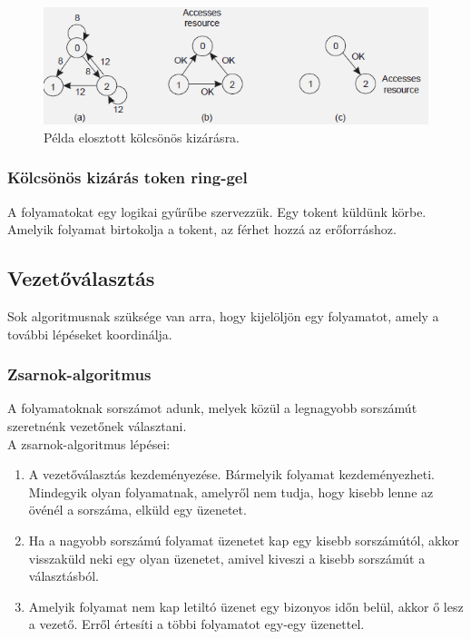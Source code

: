 \documentclass[12pt]{article}
\begin{document}
	\begin{figure}[H]
		\centering
		\includegraphics[width=0.6\linewidth]{img/kolcskizar_elosztott}
		\caption{Példa elosztott kölcsönös kizárásra.}
		\label{fig:kolcskizar_elosztott}
	\end{figure}
	
	\subsubsection{Kölcsönös kizárás token ring-gel}
	
	A folyamatokat egy logikai gyűrűbe szervezzük. Egy tokent küldünk körbe. Amelyik folyamat birtokolja a tokent, az
	férhet hozzá az erőforráshoz.
	
	\subsection{Vezetőválasztás}
	
	Sok algoritmusnak szüksége van arra, hogy kijelöljön egy folyamatot, amely a további lépéseket koordinálja.
	
	\subsubsection{Zsarnok-algoritmus}
	
	A folyamatoknak sorszámot adunk, melyek közül a legnagyobb sorszámút szeretnénk vezetőnek választani.\\
	
	\noindent A zsarnok-algoritmus lépései:
	\begin{enumerate}
		\item	A vezetőválasztás kezdeményezése. Bármelyik folyamat kezdeményezheti. Mindegyik olyan folyamatnak,
		amelyről nem tudja, hogy kisebb lenne az övénél a sorszáma, elküld egy üzenetet.
		
		\item	Ha a nagyobb sorszámú folyamat üzenetet kap egy kisebb sorszámútól, akkor visszaküld neki egy
		olyan üzenetet, amivel kiveszi a kisebb sorszámút a választásból.
		
		\item	Amelyik folyamat nem kap letiltó üzenet egy bizonyos időn belül, akkor ő lesz a vezető. Erről
		értesíti a többi folyamatot egy-egy üzenettel.
	\end{enumerate}
	
\end{document}
